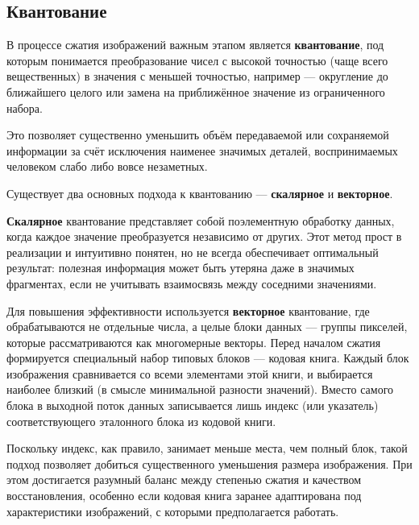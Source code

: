 \subsection{Квантование}

В процессе сжатия изображений важным этапом является \textbf{квантование}, 
под которым понимается преобразование чисел с высокой точностью (чаще всего вещественных) в значения с меньшей точностью, 
например — округление до ближайшего целого или замена на приближённое значение из ограниченного набора. 

Это позволяет существенно уменьшить объём передаваемой или сохраняемой информации за счёт исключения наименее значимых деталей, 
воспринимаемых человеком слабо либо вовсе незаметных.

Существует два основных подхода к квантованию — \textbf{скалярное} и \textbf{векторное}.

\textbf{Скалярное} квантование представляет собой поэлементную обработку данных, 
когда каждое значение преобразуется независимо от других. 
Этот метод прост в реализации и интуитивно понятен, но не всегда обеспечивает оптимальный результат: 
полезная информация может быть утеряна даже в значимых фрагментах, если не учитывать взаимосвязь между соседними значениями.

Для повышения эффективности используется \textbf{векторное} квантование, где обрабатываются не отдельные числа, 
а целые блоки данных — группы пикселей, которые рассматриваются как многомерные векторы. 
Перед началом сжатия формируется специальный набор типовых блоков — кодовая книга. 
Каждый блок изображения сравнивается со всеми элементами этой книги, и выбирается наиболее близкий (в смысле минимальной разности значений). 
Вместо самого блока в выходной поток данных записывается лишь индекс (или указатель) соответствующего эталонного блока из кодовой книги.

Поскольку индекс, как правило, занимает меньше места, чем полный блок, такой подход позволяет добиться существенного уменьшения размера изображения. 
При этом достигается разумный баланс между степенью сжатия и качеством восстановления, 
особенно если кодовая книга заранее адаптирована под характеристики изображений, с которыми предполагается работать.